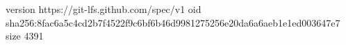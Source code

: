 version https://git-lfs.github.com/spec/v1
oid sha256:8fac6a5c4cd2b7f4522f9c6bf6b46d9981275256e20da6a6aeb1e1ed003647e7
size 4391
